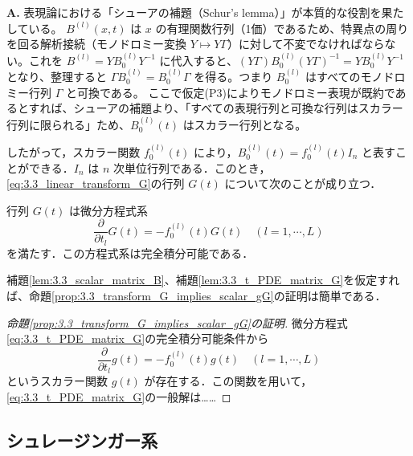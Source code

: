 \begin{Q}
\textbf{A.} 表現論における「シューアの補題（Schur's lemma）」が本質的な役割を果たしている。
$B^{(l)}(x,t)$ は $x$ の有理関数行列（1価）であるため、特異点の周りを回る解析接続（モノドロミー変換 $Y \mapsto Y\Gamma$）に対して不変でなければならない。これを $B^{(l)} = Y B_0^{(l)} Y^{-1}$ に代入すると、$(Y\Gamma) B_0^{(l)} (Y\Gamma)^{-1} = Y B_0^{(l)} Y^{-1}$ となり、整理すると $\Gamma B_0^{(l)} = B_0^{(l)} \Gamma$ を得る。つまり $B_0^{(l)}$ はすべてのモノドロミー行列 $\Gamma$ と可換である。
ここで仮定(P3)によりモノドロミー表現が既約であるとすれば、シューアの補題より、「すべての表現行列と可換な行列はスカラー行列に限られる」ため、$B_0^{(l)}(t)$ はスカラー行列となる。
\end{Q}

したがって，スカラー関数 $f_0^{(l)}(t)$ により，$B_0^{(l)}(t) = f_0^{(l)}(t)I_n$ と表すことができる．$I_n$ は $n$ 次単位行列である．このとき，\eqref{eq:3.3_linear_transform_G}の行列 $G(t)$ について次のことが成り立つ．

\begin{lemma}\label{lem:3.3_t_PDE_matrix_G}
行列 $G(t)$ は微分方程式系
\begin{equation}\label{eq:3.3_t_PDE_matrix_G}
  \frac{\partial}{\partial t_l}G(t) = -f_0^{(l)}(t)G(t) \quad (l=1,\cdots,L)
\end{equation}
を満たす．この方程式系は完全積分可能である．
\end{lemma}

補題\ref{lem:3.3_scalar_matrix_B}、補題\ref{lem:3.3_t_PDE_matrix_G}を仮定すれば、命題\ref{prop:3.3_transform_G_implies_scalar_gG}の証明は簡単である．

\begin{proof}[命題\ref{prop:3.3_transform_G_implies_scalar_gG}の証明]
微分方程式\eqref{eq:3.3_t_PDE_matrix_G}の完全積分可能条件から
\begin{equation}\label{eq:3.3_t-ODE_scalar_g}
  \frac{\partial}{\partial t_l}g(t) = -f_0^{(l)}(t)g(t) \quad (l=1,\cdots,L)
\end{equation}
というスカラー関数 $g(t)$ が存在する．この関数を用いて，\eqref{eq:3.3_t_PDE_matrix_G}の一般解は……

\end{proof}

\subsection{シュレージンガー系}

